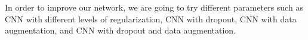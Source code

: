 \documentclass[10pt,twocolumn,letterpaper]{article}
\begin{document}
In order to improve our network, we are going to try different parameters such as CNN with different levels of regularization, CNN with dropout, CNN with data augmentation, and CNN with dropout and data augmentation. 

{\small


}
\end{document}
